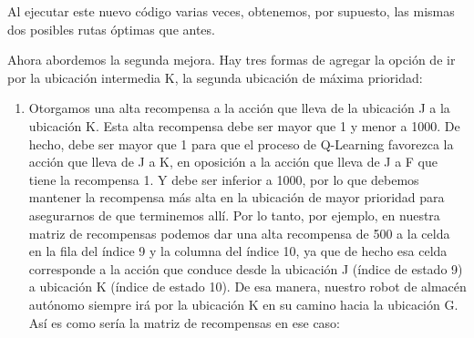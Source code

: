 \documentclass[]{book}
\providecommand{\tightlist}{%
  \setlength{\itemsep}{0pt}\setlength{\parskip}{0pt}}
\begin{document}
Al ejecutar este nuevo código varias veces, obtenemos, por supuesto, las mismas dos posibles rutas óptimas que antes.

Ahora abordemos la segunda mejora. Hay tres formas de agregar la opción de ir por la ubicación intermedia K, la segunda ubicación de máxima prioridad:

\begin{enumerate}
\def\labelenumi{\arabic{enumi}.}
\tightlist
\item
  Otorgamos una alta recompensa a la acción que lleva de la ubicación J a la ubicación K. Esta alta recompensa debe ser mayor que 1 y menor a 1000. De hecho, debe ser mayor que 1 para que el proceso de Q-Learning favorezca la acción que lleva de J a K, en oposición a la acción que lleva de J a F que tiene la recompensa 1. Y debe ser inferior a 1000, por lo que debemos mantener la recompensa más alta en la ubicación de mayor prioridad para asegurarnos de que terminemos allí. Por lo tanto, por ejemplo, en nuestra matriz de recompensas podemos dar una alta recompensa de 500 a la celda en la fila del índice 9 y la columna del índice 10, ya que de hecho esa celda corresponde a la acción que conduce desde la ubicación J (índice de estado 9) a ubicación K (índice de estado 10). De esa manera, nuestro robot de almacén autónomo siempre irá por la ubicación K en su camino hacia la ubicación G. Así es como sería la matriz de recompensas en ese caso:
\end{enumerate}
\end{document}
